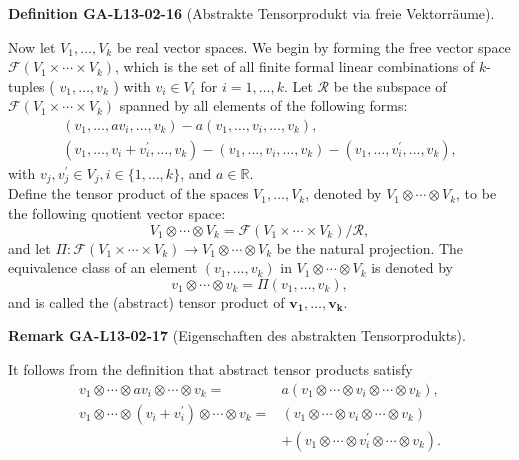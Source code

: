 \documentclass[10pt, letterpaper]{article}
\newcommand{\CustomHeading}[3]{%
  \par\medskip\noindent%
  \textbf{#1 #2} \textnormal{(#3)}.\enskip%
}
\newenvironment{DEF}[2]{\begin{unitbox}\CustomHeading{Definition}{#1}{#2}}{\end{unitbox}}
\newenvironment{REM}[2]{\begin{unitbox}\CustomHeading{Remark}{#1}{#2}}{\end{unitbox}}
\begin{document}
\begin{DEF}{GA-L13-02-16}{Abstrakte Tensorprodukt via freie Vektorräume}
Now let $V_{1}, \ldots, V_{k}$ be real vector spaces. We begin by forming the free vector space $\mathscr{F}\left(V_{1} \times \cdots \times V_{k}\right)$, which is the set of all finite formal linear combinations of $k$-tuples ( $v_{1}, \ldots, v_{k}$ ) with $v_{i} \in V_{i}$ for $i=1, \ldots, k$. Let $\mathcal{R}$ be the subspace of $\mathcal{F}\left(V_{1} \times \cdots \times V_{k}\right)$ spanned by all elements of the following forms:
$$
\begin{gathered}
\left(v_{1}, \ldots, a v_{i}, \ldots, v_{k}\right)-a\left(v_{1}, \ldots, v_{i}, \ldots, v_{k}\right), \\
\left(v_{1}, \ldots, v_{i}+v_{i}^{\prime}, \ldots, v_{k}\right)-\left(v_{1}, \ldots, v_{i}, \ldots, v_{k}\right)-\left(v_{1}, \ldots, v_{i}^{\prime}, \ldots, v_{k}\right),
\end{gathered}
$$
with $v_{j}, v_{j}^{\prime} \in V_{j}, i \in\{1, \ldots, k\}$, and $a \in \mathbb{R}$.\\
Define the tensor product of the spaces $V_{1}, \ldots, V_{k}$, denoted by $V_{1} \otimes \cdots \otimes V_{k}$, to be the following quotient vector space:
$$
V_{1} \otimes \cdots \otimes V_{k}=\mathscr{F}\left(V_{1} \times \cdots \times V_{k}\right) / \mathscr{R},
$$
and let $\Pi: \mathcal{F}\left(V_{1} \times \cdots \times V_{k}\right) \rightarrow V_{1} \otimes \cdots \otimes V_{k}$ be the natural projection. The equivalence class of an element $\left(v_{1}, \ldots, v_{k}\right)$ in $V_{1} \otimes \cdots \otimes V_{k}$ is denoted by
$$
v_{1} \otimes \cdots \otimes v_{k}=\Pi\left(v_{1}, \ldots, v_{k}\right),
$$
and is called the (abstract) tensor product of $\boldsymbol{v}_{\mathbf{1}}, \ldots, \boldsymbol{v}_{\boldsymbol{k}}$.
\end{DEF}


\begin{REM}{GA-L13-02-17}{Eigenschaften des abstrakten Tensorprodukts}
It follows from the definition that abstract tensor products satisfy
$$
\begin{aligned}
v_{1} \otimes \cdots \otimes a v_{i} \otimes \cdots \otimes v_{k}= & a\left(v_{1} \otimes \cdots \otimes v_{i} \otimes \cdots \otimes v_{k}\right), \\
v_{1} \otimes \cdots \otimes\left(v_{i}+v_{i}^{\prime}\right) \otimes \cdots \otimes v_{k}= & \left(v_{1} \otimes \cdots \otimes v_{i} \otimes \cdots \otimes v_{k}\right) \\
& +\left(v_{1} \otimes \cdots \otimes v_{i}^{\prime} \otimes \cdots \otimes v_{k}\right) .
\end{aligned}
$$
\end{REM}
\end{document}
